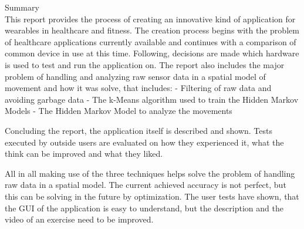 \hfill{\Huge Summary}\\
This report provides the process of creating an innovative kind of application for wearables in healthcare and fitness.
The creation process begins with the problem of healthcare applications currently available and continues with a comparison of common device in use at this time. Following, decisions are made which hardware is used to test and run the application on. \newline
The report also includes the major problem of handling and analyzing raw sensor data in a spatial model of movement and how it was solve, that includes: \newline
- Filtering of raw data and avoiding garbage data \newline
- The k-Means algorithm used to train the Hidden Markov Models \newline
- The Hidden Markov Model to analyze the movements
\newline

Concluding the report, the application itself is described and shown. Tests executed by outside users are evaluated on how they experienced it, what the think can be improved and what they liked.
\newline

All in all making use of the three techniques helps solve the problem of handling raw data in a spatial model. The current achieved accuracy is not perfect, but this can be solving in the future by optimization.
The user tests have shown, that the GUI of the application is easy to understand, but the description and the video of an exercise need to be improved.